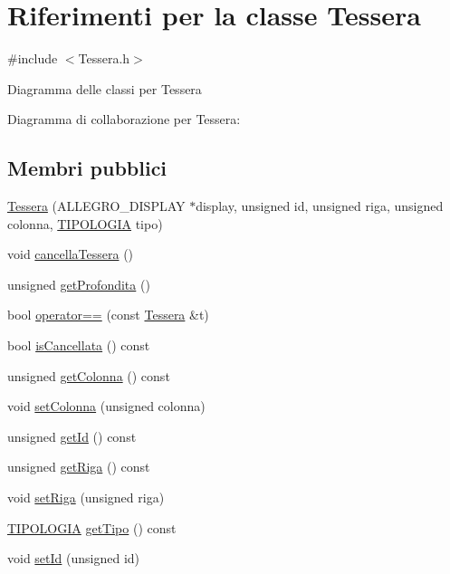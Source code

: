 \hypertarget{class_tessera}{}\section{Riferimenti per la classe Tessera}
\label{class_tessera}


{\ttfamily \#include $<$Tessera.\+h$>$}



Diagramma delle classi per Tessera


Diagramma di collaborazione per Tessera\+:
\subsection*{Membri pubblici}
\begin{DoxyCompactItemize}
\item 
\hyperlink{class_tessera_ad0a1710afcd9bd7297522f0d820003f4}{Tessera} (A\+L\+L\+E\+G\+R\+O\+\_\+\+D\+I\+S\+P\+L\+AY $\ast$display, unsigned id, unsigned riga, unsigned colonna, \hyperlink{_tessera_8h_a210ad8ee967d754da5f1a1b374663556}{T\+I\+P\+O\+L\+O\+G\+IA} tipo)
\item 
void \hyperlink{class_tessera_ac9b40eb79b65dc318b21b807ce8ded98}{cancella\+Tessera} ()
\item 
unsigned \hyperlink{class_tessera_a5ddf2120b4dcf1d208b43ade0ff4a02f}{get\+Profondita} ()
\item 
bool \hyperlink{class_tessera_a6cfbdaa4b6f790712fb474d4aaa443dc}{operator==} (const \hyperlink{class_tessera}{Tessera} \&t)
\item 
bool \hyperlink{class_tessera_a770e53ac135c5938c770721a689a87c3}{is\+Cancellata} () const
\item 
unsigned \hyperlink{class_tessera_a8bb284ce7ae9a1cbbf2a3680e271f2e2}{get\+Colonna} () const
\item 
void \hyperlink{class_tessera_aaadd2a26daf280323146037ee82e6c31}{set\+Colonna} (unsigned colonna)
\item 
unsigned \hyperlink{class_tessera_aec15746212813b92a24df30fc570a331}{get\+Id} () const
\item 
unsigned \hyperlink{class_tessera_ac30739e34616e28bce4d44c7619a7c14}{get\+Riga} () const
\item 
void \hyperlink{class_tessera_a7712f69cd258050b8872bd749f5cf47f}{set\+Riga} (unsigned riga)
\item 
\hyperlink{_tessera_8h_a210ad8ee967d754da5f1a1b374663556}{T\+I\+P\+O\+L\+O\+G\+IA} \hyperlink{class_tessera_a6b65505187ca0905e14102fa6c9faefa}{get\+Tipo} () const
\item 
void \hyperlink{class_tessera_a005db63e4b48f264ecab763de25d83c0}{set\+Id} (unsigned id)
\end{DoxyCompactItemize}
